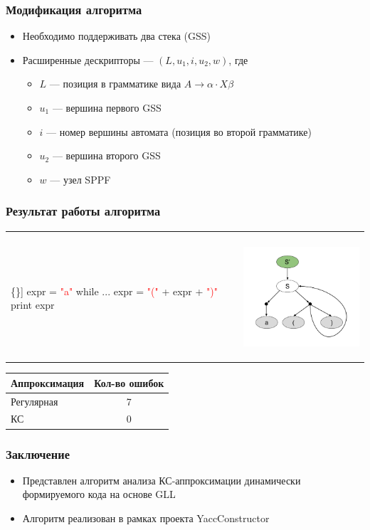 \documentclass{beamer}
\begin{document}
\begin{frame}[fragile]
	\transwipe[direction=90]
	\frametitle{Модификация алгоритма}
	\begin{itemize}
		\item Необходимо поддерживать два стека (GSS) 
		\pause
			\item Расширенные дескрипторы --- $(L, u_1, i, u_2, w)$, где
			\begin{itemize}
				\item $L$ --- позиция в грамматике вида $A \rightarrow \alpha \cdot X \beta$
				\item $u_1$ --- вершина первого GSS
				\item $i$ --- номер вершины автомата (позиция во второй грамматике)
				\item $u_2$ --- вершина второго GSS
				\item $w$ --- узел SPPF
			\end{itemize}
		\end{itemize}
\end{frame}

\begin{frame}[fragile]
	\transwipe[direction=90]
	\frametitle{Результат работы алгоритма}
	\begin{table}[h]
		\centering
		\begin{tabular}{p{5cm} p{5cm}}
			\begin{center}
				\begin{Verbatim}[commandchars=\\\{\}]
expr = \textcolor{red}{"a"}
while ...
    expr = \textcolor{red}{"("} + expr + \textcolor{red}{")"}
print expr
				\end{Verbatim}
			\end{center}
			&
			\vspace{-15pt}
			\begin{center}
				\includegraphics[width=5cm]{pictures/sppf.pdf}	
			\end{center}
	\end{tabular}
\end{table} 
\vspace{-20pt}
\begin{table}
	\centering
	\begin{tabular}{p{2.5cm} | c}
		Аппроксимация & Кол-во ошибок \\ \hline
		Регулярная & 7 \\ \hline
		\quad \quad КС & 0
	\end{tabular}
\end{table}
\end{frame}

\begin{frame}[fragile]
	\transwipe[direction=90]
	\frametitle{Заключение}
	\begin{itemize}
		\item Представлен алгоритм анализа КС-аппроксимации динамически формируемого кода на основе GLL
		\item Алгоритм реализован в рамках проекта YaccConstructor
	\end{itemize}
	
\end{frame}
\end{document}
